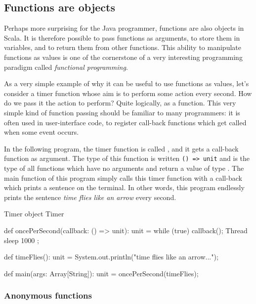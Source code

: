 \documentclass[a4paper,12pt,twoside,titlepage]{article}
\newcommand{\langname}[1]{#1\xspace}
\newcommand{\Scala}{\langname{Scala}}
\newcommand{\Java}{\langname{Java}}
\newcommand{\ident}[1]{\code{#1}\xspace}
\begin{document}
\subsection{Functions are objects}
\label{sec:funct-are-objects}

Perhaps more surprising for the \Java programmer, functions are also
objects in \Scala. It is therefore possible to pass functions as
arguments, to store them in variables, and to return them from other
functions. This ability to manipulate functions as values is one of
the cornerstone of a very interesting programming paradigm called
\emph{functional programming}.

As a very simple example of why it can be useful to use functions as
values, let's consider a timer function whose aim is to perform some
action every second. How do we pass it the action to perform? Quite
logically, as a function. This very simple kind of function passing
should be familiar to many programmers: it is often used in
user-interface code, to register call-back functions which get called
when some event occurs.

In the following program, the timer function is called
\ident{oncePerSecond}, and it gets a call-back function as argument.
The type of this function is written \verb|() => unit| and is the type
of all functions which have no arguments and return a value of type
\ident{unit}. The main function of this program simply calls this
timer function with a call-back which prints a sentence on the
terminal. In other words, this program endlessly prints the sentence
\emph{time flies like an arrow} every second.

\begin{scalaprogram}{Timer}
object Timer {
  def oncePerSecond(callback: () => unit): unit =
    while (true) { callback(); Thread sleep 1000 };

  def timeFlies(): unit =
    System.out.println("time flies like an arrow...");

  def main(args: Array[String]): unit =
    oncePerSecond(timeFlies);
}
\end{scalaprogram}

\subsubsection{Anonymous functions}
\label{sec:anonymous-functions}
\end{document}
